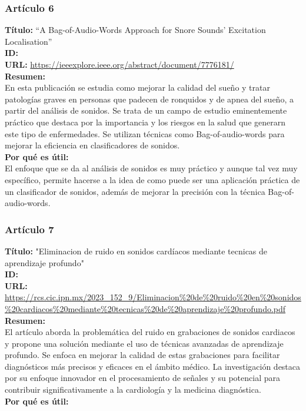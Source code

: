 \subsubsection*{Artículo 6}
    \textbf{Título:}
    “A Bag-of-Audio-Words Approach for Snore Sounds' Excitation Localisation”
    \\
    \textbf{ID: \cite{schmitt2016bag}}
    \\
    \textbf{URL:}
    \url{https://ieeexplore.ieee.org/abstract/document/7776181/}
    \\
    \textbf{Resumen:\\}
    En esta publicación se estudia como mejorar la calidad del sueño y tratar patologías graves en personas que padecen de ronquidos y de apnea del sueño, a partir del análisis de sonidos. Se trata de un campo de estudio eminentemente práctico que destaca por la importancia y los riesgos en la salud que generarn este tipo de enfermedades. Se utilizan técnicas como Bag-of-audio-words para mejorar la eficiencia en clasificadores de sonidos.
    \\
    \textbf{Por qué es útil:\\}
    El enfoque que se da al análisis de sonidos es muy práctico y aunque tal vez muy específico, permite hacerse a la idea de como puede ser una aplicación práctica de un clasificador de sonidos, además de mejorar la precisión con la técnica Bag-of-audio-words.
\subsubsection*{Artículo 7}
     \textbf{Título:}
     "Eliminacion de ruido en sonidos cardíacos mediante tecnicas de aprendizaje profundo"
     \\
     \textbf{ID: \cite{rodriguezeliminacion}}
     \\
     \textbf{URL:}
     \url{https://rcs.cic.ipn.mx/2023_152_9/Eliminacion%20de%20ruido%20en%20sonidos%20cardiacos%20mediante%20tecnicas%20de%20aprendizaje%20profundo.pdf}
     \\
     \textbf{Resumen:\\}
     El artículo aborda la problemática del ruido en grabaciones de sonidos cardiacos y propone una solución mediante el uso de técnicas avanzadas de aprendizaje profundo. Se enfoca en mejorar la calidad de estas grabaciones para facilitar diagnósticos más precisos y eficaces en el ámbito médico. La investigación destaca por su enfoque innovador en el procesamiento de señales y su potencial para contribuir significativamente a la cardiología y la medicina diagnóstica.
     \\
     \textbf{Por qué es útil:\\}
